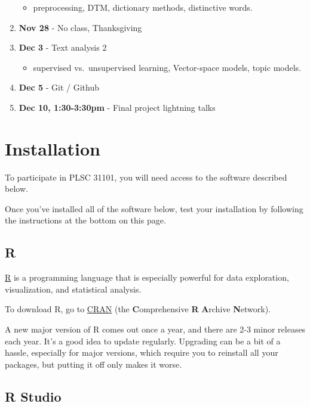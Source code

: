 \documentclass[]{book}
\providecommand{\tightlist}{%
  \setlength{\itemsep}{0pt}\setlength{\parskip}{0pt}}
\begin{document}
\begin{enumerate}
  \begin{itemize}
  \tightlist
  \item
    preprocessing, DTM, dictionary methods, distinctive words.
  \end{itemize}
\item
  \textbf{Nov 28} - No class, Thanksgiving
\item
  \textbf{Dec 3} - Text analysis 2

  \begin{itemize}
  \tightlist
  \item
    supervised vs.~unsupervised learning, Vector-space models, topic
    models.
  \end{itemize}
\item
  \textbf{Dec 5} - Git / Github
\item
  \textbf{Dec 10, 1:30-3:30pm} - Final project lightning talks
\end{enumerate}

\chapter{Installation}\label{installation}

To participate in PLSC 31101, you will need access to the software
described below.

Once you've installed all of the software below, test your installation
by following the instructions at the bottom on this page.

\section{R}\label{r}

\href{http://www.r-project.org/}{R} is a programming language that is
especially powerful for data exploration, visualization, and statistical
analysis.

To download R, go to \href{https://cran.r-project.org/}{CRAN} (the
\textbf{C}omprehensive \textbf{R} \textbf{A}rchive \textbf{N}etwork).

A new major version of R comes out once a year, and there are 2-3 minor
releases each year. It's a good idea to update regularly. Upgrading can
be a bit of a hassle, especially for major versions, which require you
to reinstall all your packages, but putting it off only makes it worse.

\section{R Studio}\label{r-studio}
\end{document}

